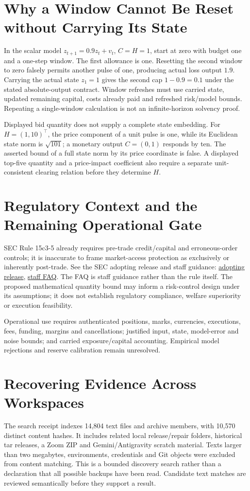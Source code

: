 \section{Why a Window Cannot Be Reset without Carrying Its State}
In the scalar model $z_{t+1}=0.9z_t+v_t$, $C=H=1$, start at zero with budget one and a one-step window. The first allowance is one. Resetting the second window to zero falsely permits another pulse of one, producing actual loss output $1.9$. Carrying the actual state $z_1=1$ gives the second cap $1-0.9=0.1$ under the stated absolute-output contract. Window refreshes must use carried state, updated remaining capital, costs already paid and refreshed risk/model bounds. Repeating a single-window calculation is not an infinite-horizon solvency proof.

Displayed bid quantity does not supply a complete state embedding. For $H=(1,10)^\top$, the price component of a unit pulse is one, while its Euclidean state norm is $\sqrt{101}$; a monetary output $C=(0,1)$ responds by ten. The asserted bound of a full state norm by its price coordinate is false. A displayed top-five quantity and a price-impact coefficient also require a separate unit-consistent clearing relation before they determine $H$.

\section{Regulatory Context and the Remaining Operational Gate}
SEC Rule 15c3-5 already requires pre-trade credit/capital and erroneous-order controls; it is inaccurate to frame market-access protection as exclusively or inherently post-trade. See the SEC adopting release and staff guidance: \href{https://www.sec.gov/rules/final/2010/34-63241.pdf}{adopting release}, \href{https://www.sec.gov/rules-regulations/staff-guidance/trading-markets-frequently-asked-questions/divisionsmarketregfaq-0}{staff FAQ}. The FAQ is staff guidance rather than the rule itself. The proposed mathematical quantity bound may inform a risk-control design under its assumptions; it does not establish regulatory compliance, welfare superiority or execution feasibility.

Operational use requires authenticated positions, marks, currencies, executions, fees, funding, margins and cancellations; justified input, state, model-error and noise bounds; and carried exposure/capital accounting. Empirical model rejections and reserve calibration remain unresolved.

\section{Recovering Evidence Across Workspaces}
The search receipt indexes 14,804 text files and archive members, with 10,570 distinct content hashes. It includes related local release/repair folders, historical tar releases, a Zoom ZIP and Gemini/Antigravity scratch material. Texts larger than two megabytes, environments, credentials and Git objects were excluded from content matching. This is a bounded discovery search rather than a declaration that all possible backups have been read. Candidate text matches are reviewed semantically before they support a result.

